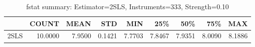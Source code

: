 \begin{table}[ht]
\centering
\caption{fstat summary: Estimator=2SLS, Instruments=333, Strength=0.10}
\begin{tabular}{lrrrrrrrr}
\toprule
 & COUNT & MEAN & STD & MIN & 25\% & 50\% & 75\% & MAX \\
\midrule
2SLS & 10.0000 & 7.9500 & 0.1421 & 7.7703 & 7.8467 & 7.9351 & 8.0090 & 8.1886 \\
\bottomrule
\end{tabular}
\end{table}
